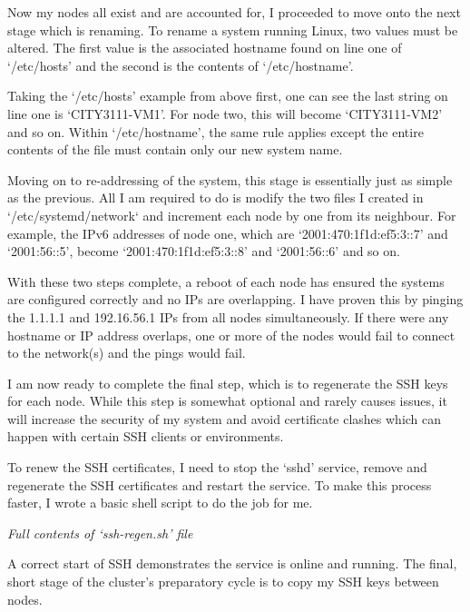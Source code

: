 Now my nodes all exist and are accounted for, I proceeded to move onto the next stage which is renaming. To rename a system running Linux, two values must be altered. The first value is the associated hostname found on line one of `/etc/hosts' and the second is the contents of `/etc/hostname'.

Taking the `/etc/hosts' example from above first, one can see the last string on line one is `CITY3111-VM1'. For node two, this will become `CITY3111-VM2' and so on. Within `/etc/hostname', the same rule applies except the entire contents of the file must contain only our new system name.

Moving on to re-addressing of the system, this stage is essentially just as simple as the previous. All I am required to do is modify the two files I created in `/etc/systemd/network` and increment each node by one from its neighbour. For example, the IPv6 addresses of node one, which are `2001:470:1f1d:ef5:3::7' and `2001:56::5', become `2001:470:1f1d:ef5:3::8' and `2001:56::6' and so on.

With these two steps complete, a reboot of each node has ensured the systems are configured correctly and no IPs are overlapping. I have proven this by pinging the 1.1.1.1 and 192.16.56.1 IPs from all nodes simultaneously. If there were any hostname or IP address overlaps, one or more of the nodes would fail to connect to the network(s) and the pings would fail.

I am now ready to complete the final step, which is to regenerate the SSH keys for each node. While this step is somewhat optional and rarely causes issues, it will increase the security of my system and avoid certificate clashes which can happen with certain SSH clients or environments.

To renew the SSH certificates, I need to stop the `sshd' service, remove and regenerate the SSH certificates and restart the service. To make this process faster, I wrote a basic shell script to do the job for me.


\begin{center}
    \emph{Full contents of `ssh-regen.sh' file}
\end{center}
\vfill\break

A correct start of SSH demonstrates the service is online and running. The final, short stage of the cluster's preparatory cycle is to copy my SSH keys between nodes.

